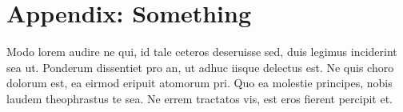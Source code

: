 \documentclass[a4paper,twoside]{article}
\begin{document}
\addtocounter{page}{-1}
\thispagestyle{empty}


\newpage
\appendix
\section*{Appendix: Something}
Modo lorem audire ne qui, id tale ceteros deseruisse sed, duis legimus inciderint sea ut. Ponderum dissentiet pro an, ut adhuc iisque delectus est. Ne quis choro dolorum est, ea eirmod eripuit atomorum pri. Quo ea molestie principes, nobis laudem theophrastus te sea. Ne errem tractatos vis, est eros fierent percipit et.

\addtocounter{page}{-1}
\thispagestyle{empty}

\end{document}
